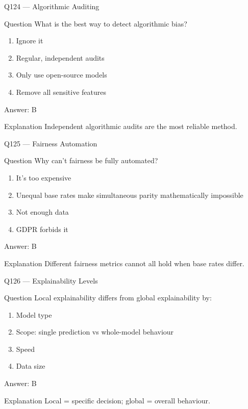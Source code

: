 \documentclass[aspectratio=169,8pt]{beamer}
\begin{document}
	\begin{frame}{Q124 --- Algorithmic Auditing}
		\begin{block}{Question}
			What is the best way to detect algorithmic bias?
		\end{block}
		\begin{enumerate}
			\item Ignore it
			\item Regular, independent audits
			\item Only use open-source models
			\item Remove all sensitive features
		\end{enumerate}
		\begin{exampleblock}{Answer: B}\end{exampleblock}
		\begin{block}{Explanation}
			Independent algorithmic audits are the most reliable method.
		\end{block}
	\end{frame}
	
	\begin{frame}{Q125 --- Fairness Automation}
		\begin{block}{Question}
			Why can't fairness be fully automated?
		\end{block}
		\begin{enumerate}
			\item It's too expensive
			\item Unequal base rates make simultaneous parity mathematically impossible
			\item Not enough data
			\item GDPR forbids it
		\end{enumerate}
		\begin{exampleblock}{Answer: B}\end{exampleblock}
		\begin{block}{Explanation}
			Different fairness metrics cannot all hold when base rates differ.
		\end{block}
	\end{frame}
	
	\begin{frame}{Q126 --- Explainability Levels}
		\begin{block}{Question}
			Local explainability differs from global explainability by:
		\end{block}
		\begin{enumerate}
			\item Model type
			\item Scope: single prediction vs whole-model behaviour
			\item Speed
			\item Data size
		\end{enumerate}
		\begin{exampleblock}{Answer: B}\end{exampleblock}
		\begin{block}{Explanation}
			Local = specific decision; global = overall behaviour.
		\end{block}
	\end{frame}
	
\end{document}
